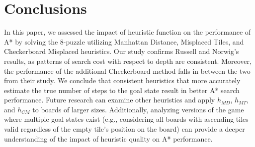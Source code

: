 
\section{Conclusions}
\label{sec:concl}

In this paper, we assessed the impact of heuristic function on the performance of A* by solving the 8-puzzle utilizing Manhattan Distance, Misplaced Tiles, and Checkerboard Misplaced heuristics. Our study confirms Russell and Norwig's results, as patterns of search cost with respect to depth are consistent. Moreover, the performance of the additional Checkerboard method falls in between the two from their study. We conclude that consistent heuristics that more accurately estimate the true number of steps to the goal state result in better A* search performance. Future research can examine other heuristics and apply $h_{MD}$, $h_{MT}$, and $h_{CM}$ to boards of larger sizes. Additionally, analyzing versions of the game where multiple goal states exist (e.g., considering all boards with ascending tiles valid regardless of the empty tile's position on the board) can provide a deeper understanding of the impact of heuristic quality on A* performance. 

 
